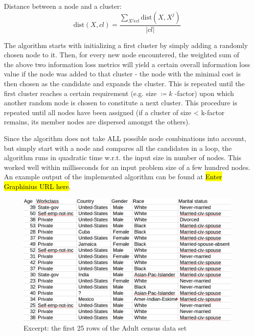 \documentclass{llncs}
\providecommand{\abs}[1]{\lvert#1\rvert}
\begin{document}
\begin{enumerate}
	Distance between a node and a cluster:
	\begin{equation*}
	\text{dist}(X, cl) = \frac{\sum_{X^j \epsilon cl} \text{dist}(X, X^j) }{\abs{cl}}
	\end{equation*}
\end{enumerate}

The algorithm starts with initializing a first cluster by simply adding a randomly chosen node to it. Then, for every new node encountered, the weighted sum of the above two information loss metrics will yield a certain overall information loss value if the node was added to that cluster - the node with the minimal cost is then chosen as the candidate and expands the cluster. This is repeated until the first cluster reaches a certain requirement (e.g. size $ \coloneqq  k $ -factor) upon which another random node is chosen to constitute a next cluster. This procedure is repeated until all nodes have been assigned (if a cluster of size < k-factor remains, its member nodes are dispersed amongst the others). 

Since the algorithm does not take ALL possible node combinations into account, but simply start with a node and compares all the candidates in a loop, the algorithm runs in quadratic time w.r.t. the input size in number of nodes. This worked well within milliseconds for an input problem size of a few hundred nodes. An example output of the implemented algorithm can be found at \hl{Enter Graphinius URL here}. \\


\begin{figure}[!t]
	\begin{center}
		\includegraphics[width=1\textwidth]{figures/anonym/anon_adults_input_sample_pic}
		\caption{Excerpt: the first 25 rows of the Adult census data set}
		\label{fig:adult_input_data_sample}
	\end{center}
\end{figure}
\end{document}
